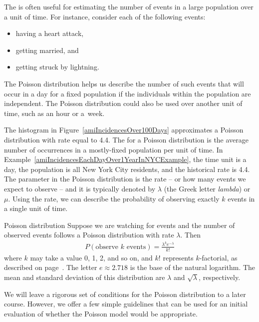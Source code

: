 The  is often useful for estimating the number of events in a large population over a unit of time. For instance, consider each of the following events:
\begin{itemize}
\setlength{\itemsep}{0mm}
\item having a heart attack,
\item getting married, and
\item getting struck by lightning.
\end{itemize}
The Poisson distribution helps us describe the number of such events that will occur in a day for a fixed population if the individuals within the population are independent. The Poisson distribution could also be used over another unit of time, such as an hour or a~week.

The histogram in Figure~\ref{amiIncidencesOver100Days} approximates a Poisson distribution with rate equal to 4.4. The  for a Poisson distribution is the average number of occurrences in a mostly-fixed population per unit of time. In Example~\ref{amiIncidencesEachDayOver1YearInNYCExample}, the time unit is a day, the population is all New York City residents, and the historical rate is 4.4. The parameter in the Poisson distribution is the rate -- or how many events we expect to observe -- and it is typically denoted by $\lambda$
(the Greek letter \emph{lambda})  or $\mu$. Using the rate, we can describe the probability of observing exactly $k$ events in a single unit of time.

\D{\newpage}

\begin{onebox}{Poisson distribution}
  Suppose we are watching for events and the number
  of observed events follows a Poisson distribution
  with rate $\lambda$.
  Then
  \begin{align*}
  P(\text{observe $k$ events})
      = \frac{\lambda^{k} e^{-\lambda}}{k!}
  \end{align*}
  where $k$ may take a value 0, 1, 2, and so on,
  and $k!$ represents $k$-factorial, as described on
  page~\pageref{factorial_defined}.
  The letter $e\approx2.718$ is the base of the natural
  logarithm.
  The mean and standard deviation of this distribution
  are $\lambda$ and $\sqrt{\lambda}$, respectively.
\end{onebox}

We will leave a rigorous set of conditions for the Poisson distribution to a later course. However, we offer a few simple guidelines that can be used for an initial evaluation of whether the Poisson model would be appropriate.

